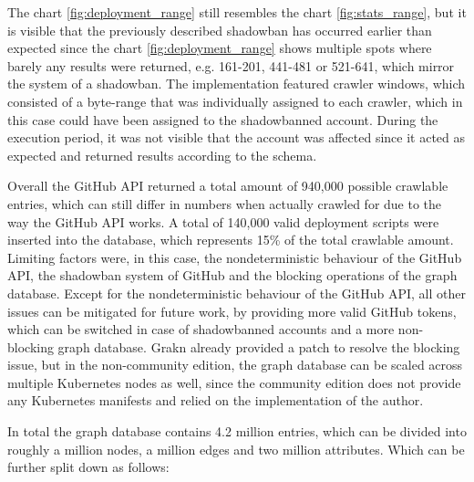 The chart \ref{fig:deployment_range} still resembles the chart \ref{fig:stats_range}, but it is visible that the previously described shadowban has occurred earlier than expected since the chart \ref{fig:deployment_range} shows multiple spots where barely any results were returned, e.g. 161-201, 441-481 or 521-641, which mirror the system of a shadowban. The implementation featured crawler windows, which consisted of a byte-range that was individually assigned to each crawler, which in this case could have been assigned to the shadowbanned account. During the execution period, it was not visible that the account was affected since it acted as expected and returned results according to the schema.

Overall the GitHub API returned a total amount of 940,000 possible crawlable entries, which can still differ in numbers when actually crawled for due to the way the GitHub API works. A total of 140,000 valid deployment scripts were inserted into the database, which represents 15\% of the total crawlable amount. Limiting factors were, in this case, the nondeterministic behaviour of the GitHub API, the shadowban system of GitHub and the blocking operations of the graph database. Except for the nondeterministic behaviour of the GitHub API, all other issues can be mitigated for future work, by providing more valid GitHub tokens, which can be switched in case of shadowbanned accounts and a more non-blocking graph database. Grakn already provided a patch to resolve the blocking issue, but in the non-community edition, the graph database can be scaled across multiple Kubernetes nodes as well, since the community edition does not provide any Kubernetes manifests and relied on the implementation of the author.

In total the graph database contains 4.2 million entries, which can be divided into roughly a million nodes, a million edges and two million attributes. Which can be further split down as follows:

